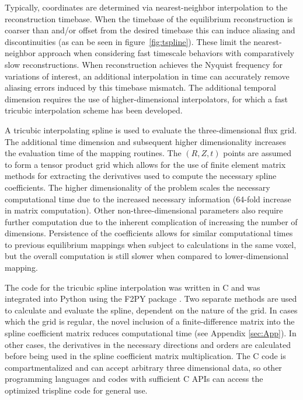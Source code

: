 \documentclass[12pt,floatfix,showpacs]{revtex4-1}
\begin{document}
Typically, coordinates are determined via nearest-neighbor interpolation to the reconstruction timebase.
When the timebase of the equilibrium reconstruction is coarser than and/or offset from the desired timebase this can induce aliasing and discontinuities (as can be seen in figure~\ref{fig:tspline}). 
These limit the nearest-neighbor approach when considering fast timescale behaviors with comparatively slow reconstructions.  
When reconstruction achieves the Nyquist frequency for variations of interest, an additional interpolation in time can accurately remove aliasing errors induced by this timebase mismatch. 
The additional temporal dimension requires the use of higher-dimensional interpolators, for which a fast tricubic interpolation scheme has been developed. 

A tricubic interpolating spline \cite{Lekien2005} is used to evaluate the three-dimensional flux grid. 
The additional time dimension and subsequent higher dimensionality increases the evaluation time of the mapping routines. 
The $(R, Z, t)$ points are assumed to form a tensor product grid which allows for the use of finite element matrix methods for extracting the derivatives used to compute the necessary spline coefficients. 
The higher dimensionality of the problem scales the necessary computational time due to the increased necessary information (64-fold increase in matrix computation). 
Other non-three-dimensional parameters also require further computation due to the inherent complication of increasing the number of dimensions. 
Persistence of the coefficients allows for similar computational times to previous equilibrium mappings when subject to calculations in the same voxel, but the overall computation is still slower when compared to lower-dimensional mapping.

The code for the tricubic spline interpolation was written in C and was integrated into Python using the F2PY package  \cite{Peterson2009}. Two separate methods are used to calculate and evaluate the spline, dependent on the nature of the grid.  
In cases which the grid is regular, the novel inclusion of a finite-difference matrix into the spline coefficient matrix reduces computational time (see Appendix \ref{sec:App}).  
In other cases, the derivatives in the necessary directions and orders are calculated before being used in the spline coefficient matrix multiplication.
The C code is compartmentalized and can accept arbitrary three dimensional data, so other programming languages and codes with sufficient C APIs can access the optimized trispline code for general use.
\end{document}
